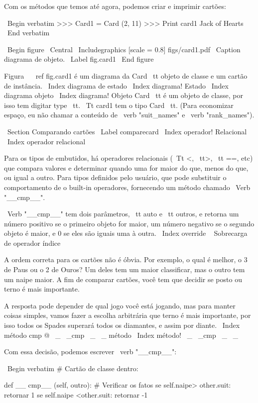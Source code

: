 \documentclass[10pt]{book}
\begin{document}
\begin {itemize}
{{{{{{{{{{{{{{{{Com os métodos que temos até agora, podemos criar e imprimir cartões:

\ Begin {verbatim}
>>> Card1 = Card (2, 11)
>>> Print card1
Jack of Hearts
\ End {verbatim}

\ Begin {figure}
\ Central
{\ Includegraphics [scale = 0.8] {figs/card1.pdf}}
\ Caption {diagrama de objeto.}
\ Label {} fig.card1
\ End {figure}

Figura ~ \ ref {} fig.card1 é um diagrama da {Card \ tt} objeto de classe
e um cartão de instância.
\ Index {diagrama de estado}
\ Index {diagrama! Estado}
\ Index {diagrama objeto}
\ Index {diagrama! Objeto}
{Card \ tt} é um objeto de classe, por isso tem digitar {type \ tt}. {\ Tt
card1} tem o tipo {Card \ tt}. (Para economizar espaço, eu não chamar a
conteúdo de \ verb "suit_names" e \ verb "rank_names").


\ Section {Comparando cartões}
\ Label {} comparecard
\ Index {operador! Relacional}
\ Index {operador relacional}

Para os tipos de embutidos, há operadores relacionais
({\ Tt <}, {\ tt>}, {\ tt ==}, etc)
que compara
valores e determinar quando uma for maior do que, menos do que, ou igual a
outro. Para tipos definidos pelo usuário, que pode substituir o comportamento de
o built-in operadores, fornecendo um método chamado
\ Verb "__cmp__".  

\ Verb "__cmp__" tem dois parâmetros, {\ tt auto} e {\ tt outros},
e retorna um número positivo se o primeiro objeto for maior, um
número negativo se o segundo objeto é maior, e 0 se eles são
iguais uma à outra.
\ Index {override}
\ {} Sobrecarga de operador índice

A ordem correta para os cartões não é óbvia.
Por exemplo, o qual
é melhor, o 3 de Paus ou o 2 de Ouros? Um deles tem um maior
classificar, mas o outro tem um naipe maior. A fim de comparar
cartões, você tem que decidir se posto ou terno é mais importante.

A resposta pode depender de qual jogo você está jogando, mas para manter
coisas simples, vamos fazer a escolha arbitrária que terno é mais
importante, por isso todos os Spades superará todos os diamantes,
e assim por diante.
\ Index {método cmp @ \ _ \ _cmp \ _ \ _ método}
\ Index {método! \ _ \ _cmp \ _ \ _}

Com essa decisão, podemos escrever \ verb "__cmp__":

\ Begin {verbatim}
# Cartão de classe dentro:

    def __ cmp__ (self, outro):
        # Verificar os fatos
        se self.naipe> other.suit: retornar 1
        se self.naipe <other.suit: retornar -1

}}}}}}}}}}}}}}}}
\end{itemize}
\end{document}
